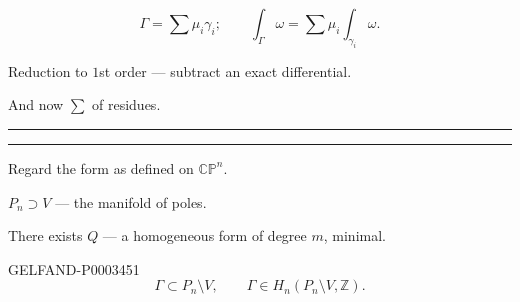 \begin{equation*}\Gamma=\sum\mu_i\gamma_i;\qquad\int_\Gamma\omega=\sum\mu_i\int_{\gamma_i}\omega.\end{equation*}

Reduction to $1$st order --- subtract an exact differential.

And now $\sum$ of residues.

\begin{center}\rule{17mm}{.35pt}\qquad\rule{17mm}{.35pt}\end{center}

Regard the form as defined on $\mathbb{CP}^n$.

$P_n\supset V$ --- the manifold of poles.

There exists $Q$ --- a homogeneous form of degree $m$, minimal.



\begin{GelfandAdjacentEvidence}{GELFAND-P000345}{1}
\begin{equation*}\Gamma\subset P_n\setminus V,\qquad\Gamma\in H_n (P_n\setminus V,\mathbb Z).\end{equation*}



\end{GelfandAdjacentEvidence}


